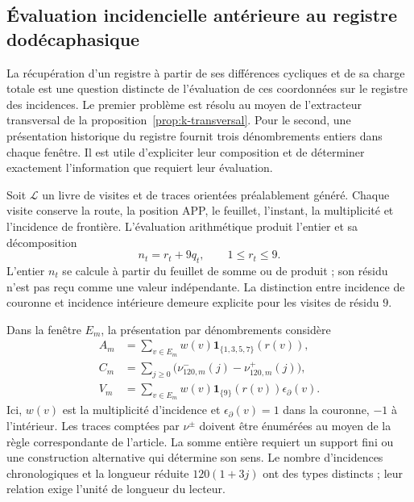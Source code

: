 \subsection{Évaluation incidencielle antérieure au registre dodécaphasique}
\label{subsec:registro-evaluacion-incidencial}

La récupération d’un registre à partir de ses différences cycliques et de sa
charge totale est une question distincte de l’évaluation de ces coordonnées
sur le registre des incidences. Le premier problème est résolu au moyen de
l’extracteur transversal de la proposition~\ref{prop:k-transversal}.
Pour le second, une présentation historique du
registre fournit trois dénombrements entiers dans chaque fenêtre. Il est utile
d’expliciter leur composition et de déterminer exactement l’information que
requiert leur évaluation.

Soit \(\mathscr L\) un livre de visites et de traces orientées préalablement
généré. Chaque visite conserve la route, la position APP, le feuillet,
l'instant, la multiplicité et l'incidence de frontière. L'évaluation
arithmétique produit l'entier et sa décomposition
\[
 n_t=r_t+9q_t,\qquad 1\leq r_t\leq9.
\]
L'entier \(n_t\) se calcule à partir du feuillet de somme ou de produit ; son
résidu n'est pas reçu comme une valeur indépendante. La distinction entre
incidence de couronne et incidence intérieure demeure explicite pour les
visites de résidu \(9\).

Dans la fenêtre \(E_m\), la présentation par dénombrements considère
\begin{align}
 A_m&=\sum_{v\in E_m}w(v)
             \mathbf1_{\{1,3,5,7\}}(r(v)),\\
 C_m&=\sum_{j\geq0}\bigl(\nu^-_{120,m}(j)-\nu^+_{120,m}(j)\bigr),\\
 V_m&=\sum_{v\in E_m}w(v)\mathbf1_{\{9\}}(r(v))\epsilon_\partial(v).
\end{align}
Ici, \(w(v)\) est la multiplicité d'incidence et \(\epsilon_\partial(v)=1\) dans la couronne, \(-1\) à l'intérieur. Les traces comptées par \(\nu^\pm\) doivent être énumérées au moyen de la règle correspondante de l'article. La somme entière requiert un support fini ou une construction alternative qui détermine son sens. Le nombre d'incidences chronologiques et la longueur réduite \(120(1+3j)\) ont des types distincts ; leur relation exige l'unité de longueur du lecteur.

